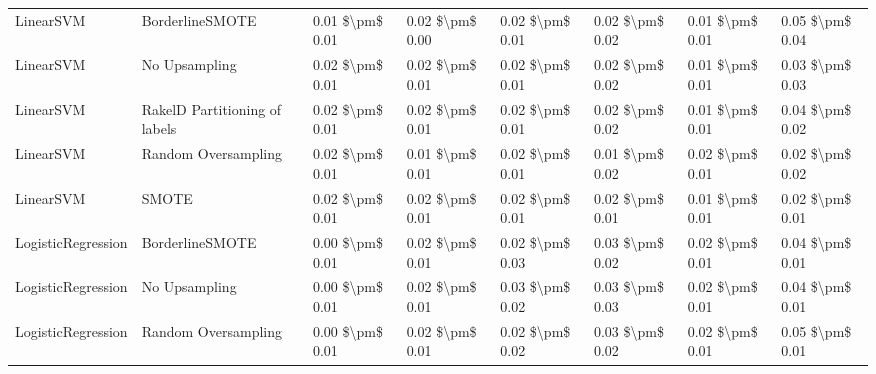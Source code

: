 \begin{tabular}{llllllll}
                      LinearSVM &               BorderlineSMOTE & 0.01 \$\textbackslash pm\$ 0.01 &           0.02 \$\textbackslash pm\$ 0.00 &       0.02 \$\textbackslash pm\$ 0.01 &        0.02 \$\textbackslash pm\$ 0.02 &                         0.01 \$\textbackslash pm\$ 0.01 &     0.05 \$\textbackslash pm\$ 0.04 \\
                      LinearSVM &                 No Upsampling & 0.02 \$\textbackslash pm\$ 0.01 &           0.02 \$\textbackslash pm\$ 0.01 &       0.02 \$\textbackslash pm\$ 0.01 &        0.02 \$\textbackslash pm\$ 0.02 &                         0.01 \$\textbackslash pm\$ 0.01 &     0.03 \$\textbackslash pm\$ 0.03 \\
                      LinearSVM & RakelD Partitioning of labels & 0.02 \$\textbackslash pm\$ 0.01 &           0.02 \$\textbackslash pm\$ 0.01 &       0.02 \$\textbackslash pm\$ 0.01 &        0.02 \$\textbackslash pm\$ 0.02 &                         0.01 \$\textbackslash pm\$ 0.01 &     0.04 \$\textbackslash pm\$ 0.02 \\
                      LinearSVM &           Random Oversampling & 0.02 \$\textbackslash pm\$ 0.01 &           0.01 \$\textbackslash pm\$ 0.01 &       0.02 \$\textbackslash pm\$ 0.01 &        0.01 \$\textbackslash pm\$ 0.02 &                         0.02 \$\textbackslash pm\$ 0.01 &     0.02 \$\textbackslash pm\$ 0.02 \\
                      LinearSVM &                         SMOTE & 0.02 \$\textbackslash pm\$ 0.01 &           0.02 \$\textbackslash pm\$ 0.01 &       0.02 \$\textbackslash pm\$ 0.01 &        0.02 \$\textbackslash pm\$ 0.01 &                         0.01 \$\textbackslash pm\$ 0.01 &     0.02 \$\textbackslash pm\$ 0.01 \\
             LogisticRegression &               BorderlineSMOTE & 0.00 \$\textbackslash pm\$ 0.01 &           0.02 \$\textbackslash pm\$ 0.01 &       0.02 \$\textbackslash pm\$ 0.03 &        0.03 \$\textbackslash pm\$ 0.02 &                         0.02 \$\textbackslash pm\$ 0.01 &     0.04 \$\textbackslash pm\$ 0.01 \\
             LogisticRegression &                 No Upsampling & 0.00 \$\textbackslash pm\$ 0.01 &           0.02 \$\textbackslash pm\$ 0.01 &       0.03 \$\textbackslash pm\$ 0.02 &        0.03 \$\textbackslash pm\$ 0.03 &                         0.02 \$\textbackslash pm\$ 0.01 &     0.04 \$\textbackslash pm\$ 0.01 \\
             LogisticRegression &           Random Oversampling & 0.00 \$\textbackslash pm\$ 0.01 &           0.02 \$\textbackslash pm\$ 0.01 &       0.02 \$\textbackslash pm\$ 0.02 &        0.03 \$\textbackslash pm\$ 0.02 &                         0.02 \$\textbackslash pm\$ 0.01 &     0.05 \$\textbackslash pm\$ 0.01 \\

\end{tabular}
